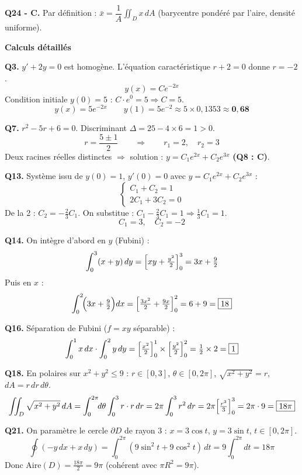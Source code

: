 \documentclass[11pt,a4paper]{article}
\begin{document}
\smallskip
\noindent\textbf{Q24 - C.} Par définition : $\bar{x} = \dfrac{1}{A}\iint_D x\,dA$ (barycentre pondéré par l'aire, densité uniforme).

\vspace{6pt}

\noindent\textbf{Calculs détaillés}

\smallskip
\noindent\textbf{Q3.} $y'+2y=0$ est homogène. L'équation caractéristique $r+2=0$ donne $r=-2$.
$$y(x) = Ce^{-2x}$$
Condition initiale $y(0)=5$ : $C\cdot e^0 = 5 \Rightarrow C=5$.
$$\boxed{y(x) = 5e^{-2x}} \qquad y(1) = 5e^{-2} \approx 5\times 0{,}1353 \approx \mathbf{0{,}68}$$

\smallskip
\noindent\textbf{Q7.} $r^2-5r+6=0$. Discriminant $\Delta = 25-4\times6 = 1 > 0$.
$$r = \frac{5\pm 1}{2} \qquad \Rightarrow \qquad \boxed{r_1 = 2,\quad r_2 = 3}$$
Deux racines réelles distinctes $\Rightarrow$ solution : $y = C_1e^{2x}+C_2e^{3x}$ \textbf{(Q8 : C)}.

\smallskip
\noindent\textbf{Q13.} Système issu de $y(0)=1$, $y'(0)=0$ avec $y=C_1e^{2x}+C_2e^{3x}$ :
$$\begin{cases}C_1+C_2 = 1\\ 2C_1+3C_2 = 0\end{cases}$$
De la 2\ieme{} : $C_2 = -\tfrac{2}{3}C_1$. On substitue : $C_1 - \tfrac{2}{3}C_1 = 1 \Rightarrow \tfrac{1}{3}C_1=1$.
$$\boxed{C_1 = 3,\quad C_2 = -2}$$

\smallskip
\noindent\textbf{Q14.} On intègre d'abord en $y$ (Fubini) :
$$\int_0^3(x+y)\,dy = \Bigl[xy+\tfrac{y^2}{2}\Bigr]_0^3 = 3x+\tfrac{9}{2}$$
Puis en $x$ :
$$\int_0^2\!\Bigl(3x+\tfrac{9}{2}\Bigr)dx = \Bigl[\tfrac{3x^2}{2}+\tfrac{9x}{2}\Bigr]_0^2 = 6+9 = \boxed{18}$$

\smallskip
\noindent\textbf{Q16.} Séparation de Fubini ($f=xy$ séparable) :
$$\int_0^1 x\,dx \cdot \int_0^2 y\,dy = \Bigl[\tfrac{x^2}{2}\Bigr]_0^1 \times \Bigl[\tfrac{y^2}{2}\Bigr]_0^2 = \tfrac{1}{2}\times 2 = \boxed{1}$$

\smallskip
\noindent\textbf{Q18.} En polaires sur $x^2+y^2\le 9$ : $r\in[0,3]$, $\theta\in[0,2\pi]$, $\sqrt{x^2+y^2}=r$, $dA=r\,dr\,d\theta$.
$$\iint_D\sqrt{x^2+y^2}\,dA = \int_0^{2\pi}\!\!d\theta\int_0^3 r\cdot r\,dr = 2\pi\int_0^3 r^2\,dr = 2\pi\Bigl[\tfrac{r^3}{3}\Bigr]_0^3 = 2\pi\cdot 9 = \boxed{18\pi}$$

\smallskip
\noindent\textbf{Q21.} On paramètre le cercle $\partial D$ de rayon 3 : $x=3\cos t$, $y=3\sin t$, $t\in[0,2\pi]$.
$$\oint(-y\,dx+x\,dy) = \int_0^{2\pi}(9\sin^2 t + 9\cos^2 t)\,dt = 9\int_0^{2\pi}dt = 18\pi$$
Donc $\mathrm{Aire}(D) = \tfrac{18\pi}{2} = \boxed{9\pi}$ \quad (cohérent avec $\pi R^2 = 9\pi$).
\end{document}
